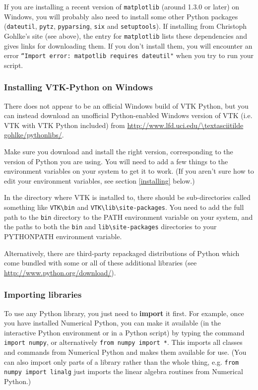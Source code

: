 If you are installing a recent version of \texttt{matplotlib} (around 1.3.0 or later) on Windows, you will probably also need to install some other Python packages (\texttt{dateutil}, \texttt{pytz}, \texttt{pyparsing}, \texttt{six} and \texttt{setuptools}). If installing from Christoph Gohlke's site (see above), the entry for \texttt{matplotlib} lists these dependencies and gives links for downloading them. If you don't install them, you will encounter an error \texttt{``Import error: matpotlib requires dateutil"} when you try to run your script.

\subsubsection{Installing VTK-Python on Windows}

There does not appear to be an official Windows build of VTK Python, but you can instead download an unofficial Python-enabled Windows version of VTK (i.e. VTK with VTK Python included) from \url{http://www.lfd.uci.edu/\textasciitilde gohlke/pythonlibs/}.

Make sure you download and install the right version, corresponding to the version of Python you are using.  You will need to add a few things to the environment variables on your system to get it to work.  (If you aren't sure how to edit your environment variables, see section \ref{installing} below.) 

In the directory where VTK is installed to, there should be sub-directories called something like \texttt{VTK\textbackslash bin} and \texttt{VTK\textbackslash lib\textbackslash site-packages}.  You need to add the full path to the \texttt{bin} directory to the PATH environment variable on your system, and the paths to both the \texttt{bin} and \texttt{lib\textbackslash site-packages} directories to your PYTHONPATH environment variable.

Alternatively, there are third-party repackaged distributions of Python which come bundled with some or all of these additional libraries (see \url{http://www.python.org/download/}).

\subsubsection{Importing libraries}

To use any Python library, you just need to \textbf{import} it first.  For example, once you have installed Numerical Python, you can make it available (in the interactive Python environment or in a Python script) by typing the command \texttt{import numpy}, or alternatively \texttt{from numpy import *}.  This imports all classes and commands from Numerical Python and makes them available for use.  (You can also import only parts of a library rather than the whole thing, e.g. \texttt{from numpy import linalg} just imports the linear algebra routines from Numerical Python.)

